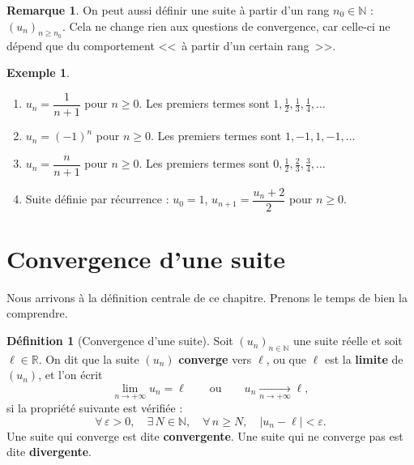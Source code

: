 \documentclass[12pt,a4paper,openany]{book}
\theoremstyle{definition}
\newtheorem{definition}{Définition}[chapter]
\newtheorem{remarque}{Remarque}[chapter]
\newtheorem{exemple}{Exemple}[chapter]
\newcommand{\N}{\mathbb{N}}
\newcommand{\R}{\mathbb{R}}
\newcommand{\eps}{\varepsilon}
\newcommand{\abs}[1]{\left\lvert #1 \right\rvert}
\begin{document}
\begin{remarque}
  On peut aussi définir une suite à partir d'un rang $n_0 \in \N$ : $(u_n)_{n \geq n_0}$.
  Cela ne change rien aux questions de convergence, car celle-ci ne dépend que du
  comportement <<~à partir d'un certain rang~>>.
\end{remarque}

\begin{exemple}\label{ex:suites-exemples}
  \begin{enumerate}[label=(\roman*)]
    \item $u_n = \dfrac{1}{n+1}$ pour $n \geq 0$. Les premiers termes sont $1, \frac{1}{2}, \frac{1}{3}, \frac{1}{4}, \ldots$
    \item $u_n = (-1)^n$ pour $n \geq 0$. Les premiers termes sont $1, -1, 1, -1, \ldots$
    \item $u_n = \dfrac{n}{n+1}$ pour $n \geq 0$. Les premiers termes sont $0, \frac{1}{2}, \frac{2}{3}, \frac{3}{4}, \ldots$
    \item Suite définie par récurrence : $u_0 = 1$, $u_{n+1} = \dfrac{u_n + 2}{2}$ pour $n \geq 0$.
  \end{enumerate}
\end{exemple}

\section{Convergence d'une suite}\label{sec:suites:convergence}

Nous arrivons à la définition centrale de ce chapitre. Prenons le temps de bien la comprendre.

\begin{definition}[Convergence d'une suite]\label{def:convergence-suite}
  Soit $(u_n)_{n \in \N}$ une suite réelle et soit $\ell \in \R$. On dit que la suite
  $(u_n)$ \textbf{converge} vers $\ell$, ou que $\ell$ est la \textbf{limite} de $(u_n)$,
  et l'on écrit
  \[
    \lim_{n \to +\infty} u_n = \ell \qquad \text{ou} \qquad u_n \xrightarrow[n \to +\infty]{} \ell,
  \]
  si la propriété suivante est vérifiée :
  \[
    \boxed{\forall\, \eps > 0, \quad \exists\, N \in \N, \quad \forall\, n \geq N, \quad \abs{u_n - \ell} < \eps.}
  \]
  Une suite qui converge est dite \textbf{convergente}. Une suite qui ne converge pas
  est dite \textbf{divergente}.
\end{definition}
\end{document}
